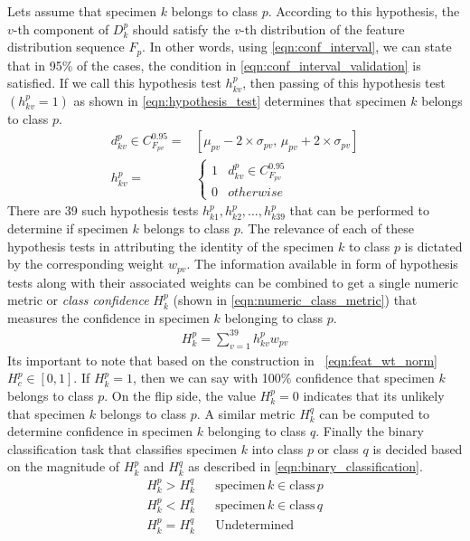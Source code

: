 \documentclass {udthesis}
\begin{document}
Lets assume that specimen $k$ belongs to class $p$. According to this hypothesis, the $v$-th component of $D^p_k$ should satisfy the $v$-th distribution of the feature distribution sequence $F_p$. In other words, using \eqref{eqn:conf_interval}, we can state that in 95\% of the cases, the condition in \eqref{eqn:conf_interval_validation} is satisfied. If we call this hypothesis test $h^p_{kv}$, then passing of this hypothesis test $(h^p_{kv}=1)$ as shown in \eqref{eqn:hypothesis_test} determines that specimen $k$ belongs to class $p$.
%
\begin{align}
  d^p_{kv} \in C^{0.95}_{F_{pv}}= &[\mu_{pv}-2 \times \sigma_{pv},\, \mu_{pv}+2 \times \sigma_{pv}]
  \label{eqn:conf_interval_validation} \\
 h^p_{kv} = &
 \begin{cases}
    1	&	d^p_{kv} \in C^{0.95}_{F_{pv}}\\
    0	&	otherwise
 \end{cases} \label{eqn:hypothesis_test}
\end{align}
%
There are 39 such hypothesis tests $h^p_{k1}, h^p_{k2},\ldots, h^p_{k39}$ that can be performed to determine if specimen $k$ belongs to class $p$.
The relevance of each of these hypothesis tests in attributing the identity of the specimen $k$ to class $p$ is dictated by the corresponding weight $w_{pv}$. The information available in form of hypothesis tests along with their associated weights can be combined to get a single numeric metric or \emph{class confidence} $H^p_k$ (shown in \eqref{eqn:numeric_class_metric}) that measures the confidence in specimen $k$ belonging to class $p$.
%
\begin{align} \label{eqn:numeric_class_metric}
 H^p_k=\sum_{v=1}^{39} h^p_{kv} w_{pv} 
\end{align}
%
Its important to note that based on the construction in ~\eqref{eqn:feat_wt_norm} $H^p_c\in[0,1]$. If $H^p_k=1$, then we can say with 100\% confidence that specimen $k$ belongs to class $p$. On the flip side, the value $H^p_k=0$ indicates that its unlikely that specimen $k$ belongs to class $p$. A similar metric $H^q_k$ can be computed to determine confidence in
specimen $k$ belonging to class $q$. Finally the binary classification task that classifies specimen $k$ into class $p$ or class $q$ is decided based on the magnitude of $H^p_k$ and $H^q_k$ as described in \eqref{eqn:binary_classification}.
%
\begin{align}	\label{eqn:binary_classification}
 H^p_k > H^q_k	&{} &\text{specimen}\, k \in \text{class}\, p\nonumber\\
 H^p_k < H^q_k	&{} &\text{specimen}\, k \in \text{class}\, q\nonumber\\
 H^p_k = H^q_k	&{} &\text{Undetermined}
\end{align}
\end{document}
